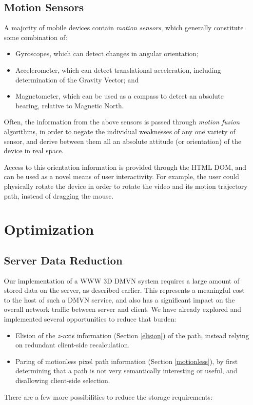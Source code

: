 \subsection{Motion Sensors}
A majority of mobile devices contain \emph{motion sensors}\cite{motion}, which generally constitute some combination of:
    \begin{itemize}
    \item Gyroscopes, which can detect changes in angular orientation;
    \item Accelerometer, which can detect translational acceleration, including determination of the Gravity Vector; and
    \item Magnetometer, which can be used as a compass to detect an absolute bearing, relative to Magnetic North.
    \end{itemize}
    Often, the information from the above sensors is passed through \emph{motion fusion}\cite{fusion} algorithms, in order to negate the individual weaknesses of any one variety of sensor, and derive between them all an absolute attitude (or orientation) of the device in real space.\par
    Access to this orientation information is provided through the HTML DOM, and can be used as a novel means of user interactivity. For example, the user could physically rotate the device in order to rotate the video and its motion trajectory path, instead of dragging the mouse.



\section{Optimization}

\subsection{Server Data Reduction}
    Our implementation of a WWW 3D DMVN system requires a large amount of stored data on the server, as described earlier. This represents a meaningful cost to the host of such a DMVN service, and also has a significant impact on the overall network traffic between server and client. We have already explored and implemented several opportunities to reduce that burden:
\begin {itemize}
    \item Elision of the $z$-axis information (Section \ref{elision}) of the path, instead relying on redundant client-side recalculation.
    \item Paring of motionless pixel path information (Section \ref{motionless}), by first determining that a path is not very semantically interesting or useful, and disallowing client-side selection.
\end {itemize}
There are a few more possibilities to reduce the storage requirements:

